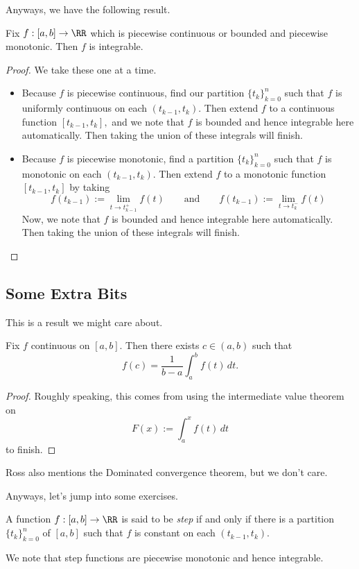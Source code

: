 \documentclass[../notes.tex]{subfiles}
\begin{document}
Anyways, we have the following result.
\begin{proposition}
	Fix $f:[a,b]\to\RR$ which is piecewise continuous or bounded and piecewise monotonic. Then $f$ is integrable.
\end{proposition}
\begin{proof}
	We take these one at a time.
	\begin{itemize}
		\item Because $f$ is piecewise continuous, find our partition $\{t_k\}_{k=0}^n$ such that $f$ is uniformly continuous on each $(t_{k-1},t_k).$ Then extend $f$ to a continuous function $[t_{k-1},t_k],$ and we note that $f$ is bounded and hence integrable here automatically. Then taking the union of these integrals will finish.
		\item Because $f$ is piecewise monotonic, find a partition $\{t_k\}_{k=0}^n$ such that $f$ is monotonic on each $(t_{k-1},t_k).$ Then extend $f$ to a monotonic function $[t_{k-1},t_k]$ by taking
		\[f(t_{k-1}):=\lim_{t\to t_{k-1}^+}f(t)\qquad\text{and}\qquad f(t_{k-1}):=\lim_{t\to t_{k}^-}f(t)\]
		Now, we note that $f$ is bounded and hence integrable here automatically. Then taking the union of these integrals will finish.
		\qedhere
	\end{itemize}
\end{proof}

\subsection{Some Extra Bits}
This is a result we might care about.
\begin{theorem}
	Fix $f$ continuous on $[a,b].$ Then there exists $c\in(a,b)$ such that
	\[f(c)=\frac1{b-a}\int_a^bf(t)\,dt.\]
\end{theorem}
\begin{proof}
	Roughly speaking, this comes from using the intermediate value theorem on
	\[F(x):=\int_a^xf(t)\,dt\]
	to finish.
\end{proof}
Ross also mentions the Dominated convergence theorem, but we don't care.

Anyways, let's jump into some exercises.
\begin{definition}[Step]
	A function $f:[a,b]\to\RR$ is said to be \textit{step} if and only if there is a partition $\{t_k\}_{k=0}^n$ of $[a,b]$ such that $f$ is constant on each $(t_{k-1},t_k).$
\end{definition}
We note that step functions are piecewise monotonic and hence integrable.
\end{document}
